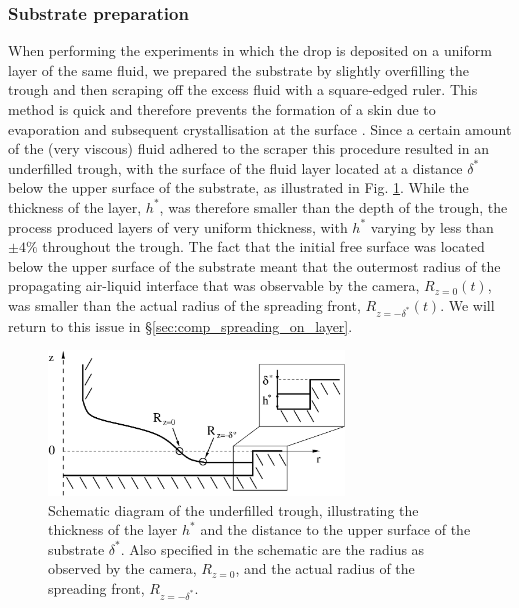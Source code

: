 \documentclass[aip,graphicx]{revtex4-1}
\begin{document}
\subsubsection{Substrate preparation\label{sec:creating_layer}}
When performing the experiments in which the drop is 
deposited on a uniform layer of the same fluid, we prepared the
substrate by slightly overfilling the trough and then scraping
off the excess fluid with a square-edged ruler. 
This method is quick and therefore prevents the formation of a skin
due to evaporation and subsequent crystallisation at the surface \cite{lees2012sugar,edwards2000science}.
Since a certain amount of the (very viscous) fluid 
adhered to the scraper this procedure resulted in an underfilled trough, 
with the surface of the fluid layer located at a distance $\delta^*$ 
below the upper surface of the substrate, as illustrated in Fig. 
\ref{fig:axisym_drop_nozzle_gap}. While the thickness of the layer, 
$h^*$, was therefore smaller than the depth of the trough, the
process produced layers of very uniform thickness, with
$h^*$ varying by less than $\pm 4\%$ throughout the trough. 
The fact that the initial free surface was located below the
upper surface of the substrate meant that the outermost radius
of the propagating air-liquid interface that was observable by the camera,
$R_{z=0}(t)$, was smaller than the actual radius of the spreading front,
 $R_{z=-\delta^*}(t)$.
We will return to this issue in \S \ref{sec:comp_spreading_on_layer}.

\begin{figure}[!ht]
\centering
\includegraphics[width=0.7\textwidth]{figures/axisym_drop_nozzle_gap_updated.eps}
\caption{Schematic diagram of the underfilled trough, illustrating the
thickness of the layer $h^*$ and the distance to the upper surface of
the substrate $\delta^*$. Also specified in the schematic are the
radius as observed by the camera, $R_{z=0}$, and the actual radius of
the spreading front, $R_{z=-\delta^*}$.}
\label{fig:axisym_drop_nozzle_gap}
\end{figure}
 
\end{document}
